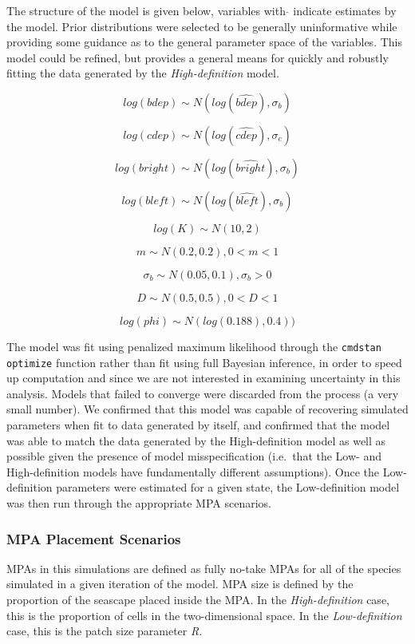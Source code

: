 \documentclass[
  default,
  lineno,
  referee]{sn-jnl}
\begin{document}
The structure of the model is given below, variables with \(\hat{}\)
indicate estimates by the model. Prior distributions were selected to be
generally uninformative while providing some guidance as to the general
parameter space of the variables. This model could be refined, but
provides a general means for quickly and robustly fitting the data
generated by the \emph{High-definition} model.

\[
log(bdep) \sim N(log(\hat{bdep}),\sigma_b)
\]

\[
log(cdep) \sim N(log(\hat{cdep}),\sigma_c)
\]

\[
log(bright) \sim N(log(\hat{bright}),\sigma_b)
\]

\[
log(bleft) \sim N(log(\hat{bleft}),\sigma_b)
\]

\[
log(K) \sim N(10,2)
\]

\[
m \sim N(0.2,0.2), 0 < m < 1
\]

\[
\sigma_b \sim N(0.05,0.1), \sigma_b > 0
\]

\[
D \sim N(0.5,0.5) ,0 < D < 1
\]

\[
log(phi) \sim N(log(0.188),0.4))
\]

The model was fit using penalized maximum likelihood through the
\texttt{cmdstan} \texttt{optimize} function rather than fit using full
Bayesian inference, in order to speed up computation and since we are
not interested in examining uncertainty in this analysis. Models that
failed to converge were discarded from the process (a very small
number). We confirmed that this model was capable of recovering
simulated parameters when fit to data generated by itself, and confirmed
that the model was able to match the data generated by the
High-definition model as well as possible given the presence of model
misspecification (i.e.~that the Low- and High-definition models have
fundamentally different assumptions). Once the Low-definition parameters
were estimated for a given state, the Low-definition model was then run
through the appropriate MPA scenarios.

\subsubsection{MPA Placement Scenarios}\label{mpa-placement-scenarios}

MPAs in this simulations are defined as fully no-take MPAs for all of
the species simulated in a given iteration of the model. MPA size is
defined by the proportion of the seascape placed inside the MPA. In the
\emph{High-definition} case, this is the proportion of cells in the
two-dimensional space. In the \emph{Low-definition} case, this is the
patch size parameter \emph{R}.
\end{document}
